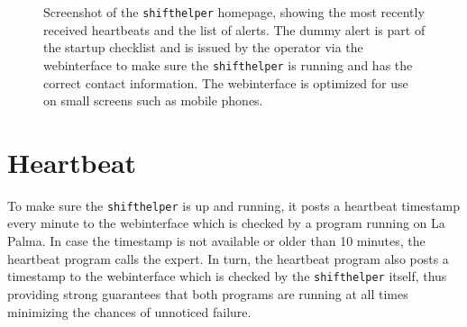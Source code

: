 \begin{figure}
  \begin{captionbeside}{%
    Screenshot of the \texttt{shifthelper} homepage, showing the most recently received
    heartbeats and the list of alerts.
    The dummy alert is part of the startup checklist and is issued by the
    operator via the webinterface to make sure the \texttt{shifthelper} is running and  has the correct contact
    information.
    The webinterface is optimized for use on small screens such as mobile phones.
    \label{fig:webinterface}%
  }%
  \end{captionbeside}
\end{figure}

\section{Heartbeat}

To make sure the \texttt{shifthelper} is up and running,
it posts a heartbeat timestamp every minute to the webinterface which is checked
by a program running on La Palma.
In case the timestamp is not available or older than 10 minutes, 
the heartbeat program calls the expert. 
In turn, the heartbeat program also posts a timestamp to the webinterface which
is checked by the \texttt{shifthelper} itself, thus providing strong guarantees
that both programs are running at all times minimizing the chances of unnoticed failure. 
